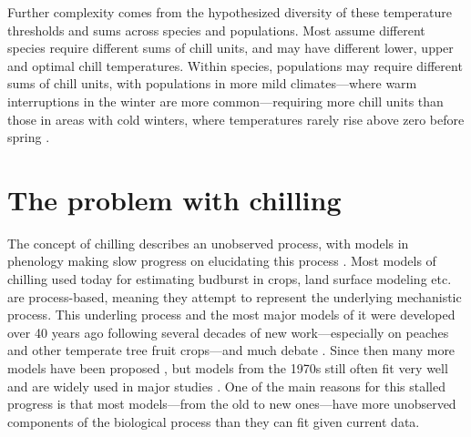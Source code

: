 \documentclass[11pt]{article}
\begin{document}
Further complexity comes from the hypothesized diversity of these temperature thresholds and sums across species and populations. Most assume different species require different sums of chill units, and may have different lower, upper and optimal chill temperatures. Within species, populations may require different sums of chill units, with populations in more mild climates---where warm interruptions in the winter are more common---requiring more chill units than those in areas with cold winters, where temperatures rarely rise above zero before spring \citep{campbell1979,leinonen1996dependence}. 

\section*{The problem with chilling} 
The concept of chilling describes an unobserved process, with models in phenology making slow progress on elucidating this process \citep{chuine2016,hanninen2019experiments}. 
Most models of chilling used today for estimating budburst in crops, land surface modeling etc. are process-based, meaning they attempt to represent the underlying mechanistic process. 
This underling process and the most major models of it were developed over 40 years ago \citep{richardson1974} following several decades of new work---especially on peaches and other temperate tree fruit crops---and much debate \citep{dormtreeproc}. Since then many more models have been proposed \citep{luedeling2012chilling,chuine2016}, but models from the 1970s still often fit very well \citep{basler2016evaluating,chuine2016} and are widely used in major studies \citep[e.g.,][]{richardson1974,chuine2016,ospreebbms}. One of the main reasons for this stalled progress is that most models---from the old to new ones---have more unobserved components of the biological process than they can fit given current data. 
\end{document}
